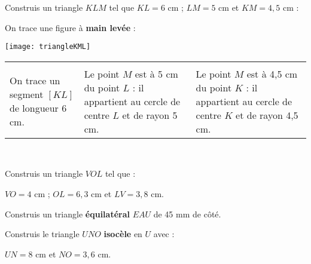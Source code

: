 \begin{methode*1}

\begin{exemple*1}
Construis un triangle $KLM$ tel que $KL = 6$ cm ; $LM = 5$ cm et $KM = 4,5$ cm :

On trace une figure à \textbf{main levée} :
\begin{center} \texttt{[image: triangleKML]} \end{center}

\begin{tabularx}{\textwidth}{X|X|X}
  &   & 
  \\ 
 On trace un segment $[KL]$ de longueur 6 cm. & Le point $M$ est à 5 cm du point $L$ : il appartient au cercle de centre $L$ et de rayon 5 cm. & Le point $M$ est à 4,5 cm du point $K$ : il appartient au cercle de centre $K$ et de rayon 4,5 cm. \\
\end{tabularx} \\

\end{exemple*1}

\exercice 
Construis un triangle $VOL$ tel que :

$VO = 4$ cm ; $OL = 6,3$ cm et $LV = 3,8$ cm.

\vspace{2cm}

\exercice 
Construis un triangle \textbf{équilatéral} $EAU$ de 45 mm de côté.

\vspace{2cm}

\exercice 
Construis le triangle $UNO$ \textbf{isocèle} en $U$ avec :

$UN = 8$ cm et $NO = 3,6$ cm.
 
\end{methode*1}
